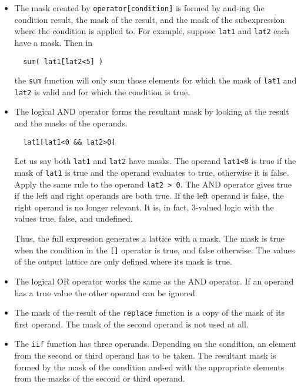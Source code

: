 \begin{itemize}
\item
The mask created by \texttt{operator[condition]} is formed by and-ing the
condition result, the mask of the result, and the mask of the subexpression
where the condition is applied to.   For example, suppose \texttt{lat1} and
\texttt{lat2} each  have a mask. Then in
\begin{verbatim}
  sum( lat1[lat2<5] )
\end{verbatim}
the \texttt{sum} function will only sum those elements for which
the mask of \texttt{lat1} and \texttt{lat2} is valid and for which
the condition is true.

\item
The logical AND operator forms the resultant mask by looking at the
result and the masks of the operands.  

\begin{verbatim}
  lat1[lat1<0 && lat2>0]
\end{verbatim}
Let us say both {\tt lat1} and {\tt lat2} have masks.  The operand
{\tt lat1<0} is true if the mask of {\tt lat1} is true and the
operand evaluates to true, otherwise it is false.  Apply the same
rule to the operand {\tt lat2 > 0}.  The AND operator gives true if
the left and right operands are both true.  If the left operand
is false, the right operand is no longer relevant.  It is, in
fact, 3-valued logic with the values true, false, and undefined. 

\medskip\noindent Thus, the full expression generates a lattice with a mask.
The mask is true when the condition in the {\tt []} operator
is true, and false otherwise.  The values of the output lattice are only
defined where its mask is true.

\item
The logical OR operator works the same as the AND operator.  If
an operand has a true value the other operand can be ignored.

\item
The mask of the result of the \texttt{replace} function is a copy
of the mask of its first operand. The mask of the second operand is
not used at all.

\item
The \texttt{iif} function has three operands. Depending on the
condition, an element from the second or third operand has to be taken.
The resultant mask is formed by the mask of the condition and-ed
with the appropriate elements from the masks of the second or third
operand.


\end{itemize}
